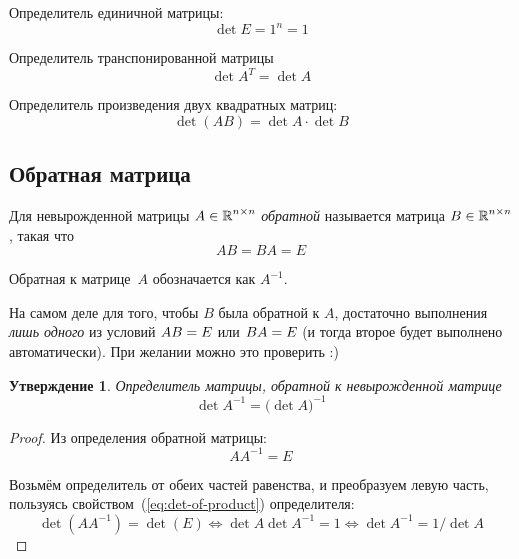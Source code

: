 \documentclass[a4paper,12pt]{article}
\newtheorem{proposition}{Утверждение}[section]
\theoremstyle{remark}
\begin{document}
  \begin{example}
    Определитель единичной матрицы:
    \[
      \det E = 1^n = 1
    \]
  \end{example}
  
  \begin{theorem}
    Определитель транспонированной матрицы
    \[
      \det A^T = \det A
    \]
  \end{theorem}
  
  \begin{theorem}
    Определитель произведения двух квадратных матриц:
    \begin{equation}\label{eq:det-of-product}
      \det (AB) = \det A \cdot \det B
    \end{equation}
  \end{theorem}
  
  
  \subsection{Обратная матрица}
  
  \begin{definition}
    Для невырожденной матрицы $A \hm\in \RR^{n\times n}$ \emph{обратной} называется матрица $B \hm\in \RR^{n\times n}$, такая что
    \[
      AB = BA = E
    \]
    
    Обратная к матрице~$A$ обозначается как $A^{-1}$.
  \end{definition}
  
  \begin{remark}
    На самом деле для того, чтобы $B$ была обратной к $A$, достаточно выполнения \emph{лишь одного} из условий $AB \hm= E$ или $BA \hm= E$ (и тогда второе будет выполнено автоматически).
    При желании можно это проверить :)
  \end{remark}
  
  \begin{proposition}
    Определитель матрицы, обратной к \emph{невырожденной} матрице
    \[
      \det A^{-1} = \bigl(\det A\bigl)^{-1}
    \]
  \end{proposition}
  
  \begin{proof}
    Из определения обратной матрицы:
    \[
      A A^{-1} = E
    \]
    
    Возьмём определитель от обеих частей равенства, и преобразуем левую часть, пользуясь свойством~(\ref{eq:det-of-product}) определителя:
    \[
      \det\left(A A^{-1}\right) = \det(E)
        \Leftrightarrow \det A \det A^{-1} = 1
        \Leftrightarrow \det A^{-1} = 1 / \det A
    \]
  \end{proof}
  
\end{document}
